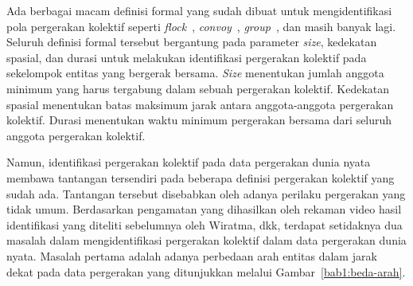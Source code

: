 

\iffalse 

\lionov{sebaiknya ada ilustrasi kayak Figure 1.7 di thesis, buat memperjelas apa itu pergerakan kolektif} \cristopher{sedang digambar}.
\fi

Ada berbagai macam definisi formal yang sudah dibuat untuk mengidentifikasi pola pergerakan kolektif seperti \textit{flock}~\cite{cao:flock, gudmundsson:flock}, \textit{convoy}~\cite{jeung:convoys}, \textit{group}~\cite{buchin:group, yida:group}, dan masih banyak lagi. Seluruh definisi formal tersebut bergantung pada parameter \textit{size}\iffalse \lionov{ini jadi aneh, pake {\it size} aja deh} kelompok \fi, kedekatan spasial, dan durasi untuk melakukan identifikasi pergerakan kolektif pada sekelompok entitas yang bergerak bersama. \textit{Size} menentukan jumlah anggota minimum yang harus tergabung dalam sebuah pergerakan kolektif. Kedekatan spasial menentukan batas maksimum jarak antara anggota-anggota pergerakan kolektif. Durasi menentukan waktu minimum pergerakan bersama dari seluruh anggota pergerakan kolektif.

Namun, identifikasi pergerakan kolektif pada data pergerakan dunia nyata membawa tantangan tersendiri pada beberapa definisi pergerakan kolektif yang sudah ada. Tantangan tersebut disebabkan oleh adanya perilaku pergerakan yang tidak umum. Berdasarkan pengamatan yang dihasilkan oleh rekaman video hasil identifikasi yang diteliti sebelumnya oleh Wiratma, dkk\footnotemark[8], terdapat setidaknya dua masalah dalam mengidentifikasi pergerakan kolektif dalam data pergerakan dunia nyata. Masalah pertama adalah adanya perbedaan arah entitas dalam jarak dekat pada data pergerakan yang ditunjukkan melalui Gambar~\ref{bab1:beda-arah}.


